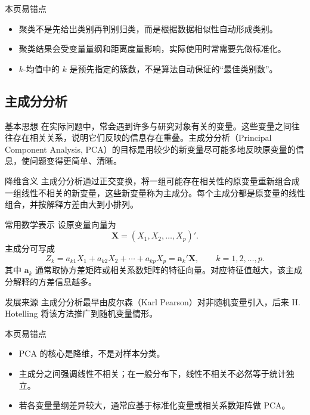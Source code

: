 \documentclass[UTF8,zihao=-4,fontset=fandol]{ctexart}
\begin{document}
\begin{warnbox}{本页易错点}
\begin{itemize}
  \item 聚类不是先给出类别再判别归类，而是根据数据相似性自动形成类别。
  \item 聚类结果会受变量量纲和距离度量影响，实际使用时常需要先做标准化。
  \item $k$-均值中的 $k$ 是预先指定的簇数，不是算法自动保证的“最佳类别数”。
\end{itemize}
\end{warnbox}

\subsection{主成分分析}

\begin{keybox}{基本思想}
在实际问题中，常会遇到许多与研究对象有关的变量。这些变量之间往往存在相关关系，说明它们反映的信息存在重叠。主成分分析（Principal Component Analysis, PCA）的目标是用较少的新变量尽可能多地反映原变量的信息，使问题变得更简单、清晰。
\end{keybox}

\begin{methodbox}{降维含义}
主成分分析通过正交变换，将一组可能存在相关性的原变量重新组合成一组线性不相关的新变量，这些新变量称为主成分。每个主成分都是原变量的线性组合，并按解释方差由大到小排列。
\end{methodbox}

\begin{keybox}{常用数学表示}
设原变量向量为
\[
\mathbf X=(X_1,X_2,\ldots,X_p)'.
\]
主成分可写成
\[
Z_k=a_{k1}X_1+a_{k2}X_2+\cdots+a_{kp}X_p
=\mathbf a_k'\mathbf X,\qquad k=1,2,\ldots,p.
\]
其中 $\mathbf a_k$ 通常取协方差矩阵或相关系数矩阵的特征向量。对应特征值越大，该主成分解释的方差信息越多。
\end{keybox}

\begin{methodbox}{发展来源}
主成分分析最早由皮尔森（Karl Pearson）对非随机变量引入，后来 H. Hotelling 将该方法推广到随机变量情形。
\end{methodbox}

\begin{warnbox}{本页易错点}
\begin{itemize}
  \item PCA 的核心是降维，不是对样本分类。
  \item 主成分之间强调线性不相关；在一般分布下，线性不相关不必然等于统计独立。
  \item 若各变量量纲差异较大，通常应基于标准化变量或相关系数矩阵做 PCA。
\end{itemize}
\end{warnbox}
\end{document}
